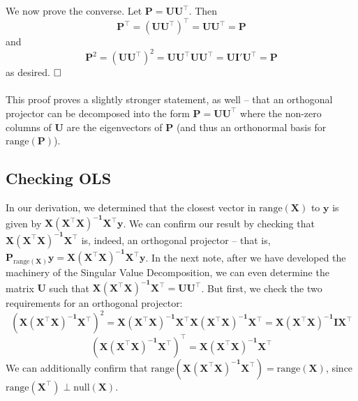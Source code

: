 \documentclass{article}
\begin{document}
We now prove the converse. Let $\mathbf{P} = \mathbf{UU^{\top}}$. Then $$\mathbf{P}^{\top} = (\mathbf{UU^{\top}})^{\top} = \mathbf{UU^{\top}} = \mathbf{P}$$ and $$\mathbf{P}^2 = (\mathbf{UU^{\top}})^2 = \mathbf{UU^{\top}UU^{\top}} = \mathbf{UI'U^{\top}} = \mathbf{P}$$ as desired. $\hfill\square$\\\\
This proof proves a slightly stronger statement, as well -- that an orthogonal projector can be decomposed into the form $\mathbf{P} = \mathbf{UU}^{\top}$ where the non-zero columns of $\mathbf{U}$ are the eigenvectors of $\mathbf{P}$ (and thus an orthonormal basis for $\text{range}(\mathbf{P})$).


\subsection*{Checking OLS}
In our derivation, we determined that the closest vector in $\text{range}(\mathbf{X})$ to $\mathbf{y}$ is given by $\mathbf{X(X^{\top}X)^{-1}X^{\top}y}$. We can confirm our result by checking that $\mathbf{X(X^{\top}X)^{-1}X^{\top}}$ is, indeed, an orthogonal projector -- that is, $\mathbf{P}_{\text{range}(\mathbf{X})}\mathbf{y} = \mathbf{X(X^{\top}X)^{-1}X^{\top}y}$. In the next note, after we have developed the machinery of the Singular Value Decomposition, we can even determine the matrix $\mathbf{U}$ such that $\mathbf{X(X^{\top}X)^{-1}X^{\top}} = \mathbf{UU^{\top}}$. But first, we check the two requirements for an orthogonal projector: $$(\mathbf{X(X^{\top}X)^{-1}X^{\top}})^2 = \mathbf{X(X^{\top}X)^{-1}X^{\top}X(X^{\top}X)^{-1}X^{\top}} = \mathbf{X(X^{\top}X)^{-1}IX^{\top}}$$ $$(\mathbf{X(X^{\top}X)^{-1}X^{\top}})^{\top} = \mathbf{X(X^{\top}X)^{-1}X^{\top}}$$ We can additionally confirm that $\text{range}(\mathbf{X(X^{\top}X)^{-1}X^{\top}}) = \text{range}(\mathbf{X})$, since $\text{range}(\mathbf{X^{\top}}) \perp \text{null}(\mathbf{X})$.
\clearpage
\end{document}
